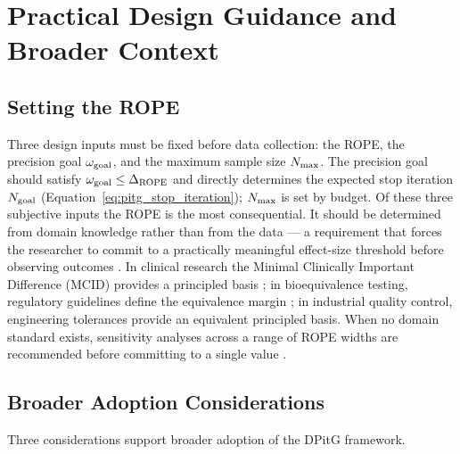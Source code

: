 \section{Practical Design Guidance and Broader Context}\label{app:practical_guidance}

\subsection*{Setting the ROPE}

Three design inputs must be fixed before data collection: the ROPE, the precision goal
$\omega_{\rm goal}$, and the maximum sample size $N_{\rm max}$.
The precision goal should satisfy $\omega_{\rm goal} \leq \Delta_{\rm ROPE}$ and directly
determines the expected stop iteration $N_{\rm goal}$
(Equation~\ref{eq:pitg_stop_iteration}); $N_{\rm max}$ is set by budget.
Of these three subjective inputs the ROPE is the most consequential.
It should be determined from domain knowledge rather than from the data ---
a requirement that forces the researcher to commit to a practically meaningful
effect-size threshold before observing outcomes \citep{kruschke2018}.
In clinical research the Minimal Clinically Important Difference (MCID) provides a
principled basis \citep{jaeschke1989}; in bioequivalence testing, regulatory guidelines define the equivalence
margin \citep{schuirmann1987}; in industrial quality
control, engineering tolerances provide an equivalent principled basis.
When no domain standard exists, sensitivity analyses across a range of ROPE widths
are recommended before committing to a single value \citep{lakens2018}.

\subsection*{Broader Adoption Considerations}

Three considerations support broader adoption of the DPitG framework.


